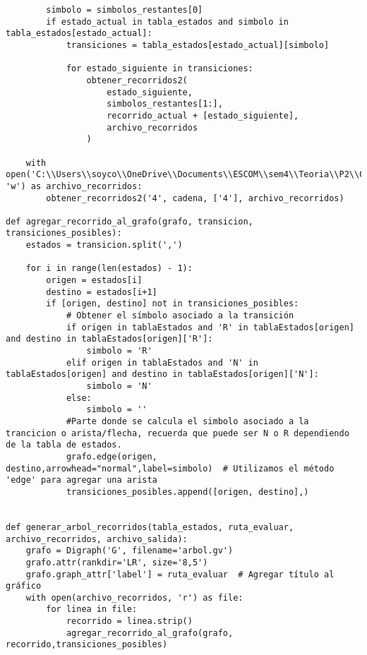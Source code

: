 \begin{lstlisting}
        simbolo = simbolos_restantes[0]
        if estado_actual in tabla_estados and simbolo in tabla_estados[estado_actual]:
            transiciones = tabla_estados[estado_actual][simbolo]

            for estado_siguiente in transiciones:
                obtener_recorridos2(
                    estado_siguiente,
                    simbolos_restantes[1:],
                    recorrido_actual + [estado_siguiente],
                    archivo_recorridos
                )

    with open('C:\\Users\\soyco\\OneDrive\\Documents\\ESCOM\\sem4\\Teoria\\P2\\Chess\\output\\recorridos_negra.txt', 'w') as archivo_recorridos:
        obtener_recorridos2('4', cadena, ['4'], archivo_recorridos)

def agregar_recorrido_al_grafo(grafo, transicion, transiciones_posibles):
    estados = transicion.split(',')

    for i in range(len(estados) - 1):
        origen = estados[i]
        destino = estados[i+1]
        if [origen, destino] not in transiciones_posibles:
            # Obtener el símbolo asociado a la transición
            if origen in tablaEstados and 'R' in tablaEstados[origen] and destino in tablaEstados[origen]['R']:
                simbolo = 'R'
            elif origen in tablaEstados and 'N' in tablaEstados[origen] and destino in tablaEstados[origen]['N']:
                simbolo = 'N'
            else:
                simbolo = ''
            #Parte donde se calcula el simbolo asociado a la trancicion o arista/flecha, recuerda que puede ser N o R dependiendo de la tabla de estados.
            grafo.edge(origen, destino,arrowhead="normal",label=simbolo)  # Utilizamos el método 'edge' para agregar una arista
            transiciones_posibles.append([origen, destino],)
    

def generar_arbol_recorridos(tabla_estados, ruta_evaluar, archivo_recorridos, archivo_salida):
    grafo = Digraph('G', filename='arbol.gv')
    grafo.attr(rankdir='LR', size='8,5')
    grafo.graph_attr['label'] = ruta_evaluar  # Agregar título al gráfico
    with open(archivo_recorridos, 'r') as file:
        for linea in file:
            recorrido = linea.strip()
            agregar_recorrido_al_grafo(grafo, recorrido,transiciones_posibles)
        

\end{lstlisting}
